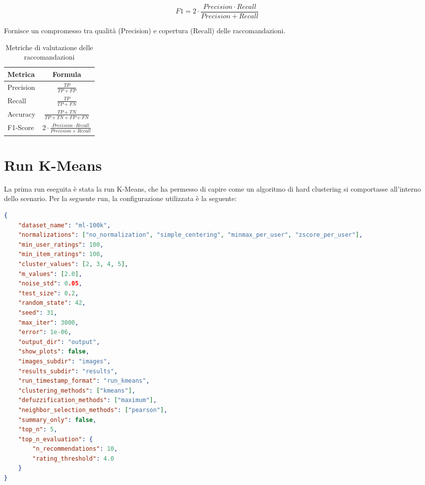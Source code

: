 \[
F1 = 2 \cdot \frac{Precision \cdot Recall}{Precision + Recall}
\]

Fornisce un compromesso tra qualità (Precision) e copertura (Recall) delle raccomandazioni.


\begin{table}[H]
  \centering
  \begin{tabular}{|l|c|}
  \hline
  \textbf{Metrica} & \textbf{Formula} \\
  \hline
  Precision & $\displaystyle \frac{TP}{TP + FP}$ \\
  Recall & $\displaystyle \frac{TP}{TP + FN}$ \\
  Accuracy & $\displaystyle \frac{TP + TN}{TP + TN + FP + FN}$ \\
  F1-Score & $\displaystyle 2 \cdot \frac{Precision \cdot Recall}{Precision + Recall}$ \\
  \hline
  \end{tabular}
  \caption{Metriche di valutazione delle raccomandazioni}
\end{table}

\section{Run K-Means}

La prima run eseguita è stata la run K-Means, che ha permesso di capire come un algoritmo di hard clustering si comportasse all'interno dello scenario. Per la seguente run, la configurazione utilizzata è la seguente:

\begin{lstlisting}[language=json, caption=Configurazione Run FCM Deep Dive]
{
    "dataset_name": "ml-100k",
    "normalizations": ["no_normalization", "simple_centering", "minmax_per_user", "zscore_per_user"],
    "min_user_ratings": 100,
    "min_item_ratings": 100,
    "cluster_values": [2, 3, 4, 5],
    "m_values": [2.0],
    "noise_std": 0.05,
    "test_size": 0.2,
    "random_state": 42,
    "seed": 31,
    "max_iter": 3000,
    "error": 1e-06,
    "output_dir": "output",
    "show_plots": false,
    "images_subdir": "images",
    "results_subdir": "results",
    "run_timestamp_format": "run_kmeans",
    "clustering_methods": ["kmeans"],
    "defuzzification_methods": ["maximum"],
    "neighbor_selection_methods": ["pearson"],
    "summary_only": false,
    "top_n": 5,
    "top_n_evaluation": {
        "n_recommendations": 10,
        "rating_threshold": 4.0
    }
} 
\end{lstlisting}

